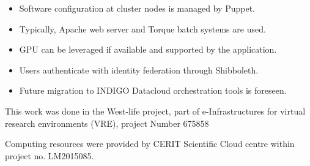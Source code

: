 \documentclass[portrait,final,a0paper,fontscale=0.27]{baposter}
\begin{document}
\begin{poster}
{\begin{itemize}
\item Software configuration at cluster nodes is managed by \alert{Puppet}.

\item Typically, \alert{Apache} web server and \alert{Torque} batch systems are used.

\item \alert{GPU} can be leveraged if available and supported by the application.

\item Users authenticate with identity federation through \alert{Shibboleth}.

\item Future migration to \alert{INDIGO Datacloud} orchestration tools is foreseen.

\end{itemize}
}

{
This work was done in the West-life project, part of 
e-Infrastructures for virtual research environments (VRE), project Number 675858

Computing resources were provided by CERIT Scientific Cloud
centre within project no. LM2015085.
}

\end{poster}
\end{document}
